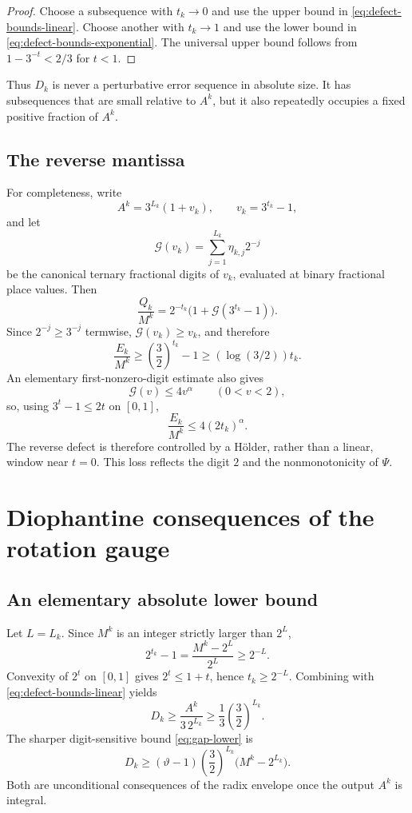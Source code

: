 \documentclass[11pt]{article}
\theoremstyle{definition}
\theoremstyle{remark}
\newcommand{\PsiMap}{\Psi}
\newcommand{\thetaAE}{\vartheta}
\newcommand{\alphaAE}{\alpha}
\begin{document}
\begin{proof}
Choose a subsequence with $t_k\to0$ and use the upper bound in
\eqref{eq:defect-bounds-linear}.  Choose another with $t_k\to1$ and use the
lower bound in \eqref{eq:defect-bounds-exponential}.  The universal upper
bound follows from $1-3^{-t}<2/3$ for $t<1$.
\end{proof}

Thus $D_k$ is never a perturbative error sequence in absolute size.  It has
subsequences that are small relative to $A^k$, but it also repeatedly occupies
a fixed positive fraction of $A^k$.

\subsection{The reverse mantissa}

For completeness, write
\[
 A^k=3^{L_k}(1+v_k),\qquad v_k=3^{t_k}-1,
\]
and let
\[
  \mathcal G(v_k)=\sum_{j=1}^{L_k}\eta_{k,j}2^{-j}
\]
be the canonical ternary fractional digits of $v_k$, evaluated at binary
fractional place values.  Then
\[
  \frac{Q_k}{M^k}
  =2^{-t_k}\bigl(1+\mathcal G(3^{t_k}-1)\bigr).
\]
Since $2^{-j}\ge3^{-j}$ termwise,
$\mathcal G(v_k)\ge v_k$, and therefore
\begin{equation}\label{eq:E-lower}
  \frac{E_k}{M^k}
  \ge\left(\frac32\right)^{t_k}-1
  \ge(\log(3/2))t_k.
\end{equation}
An elementary first-nonzero-digit estimate also gives
\[
  \mathcal G(v)\le4v^{\alphaAE}\qquad(0<v<2),
\]
so, using $3^t-1\le2t$ on $[0,1]$,
\begin{equation}\label{eq:E-upper}
  \frac{E_k}{M^k}
  \le4(2t_k)^{\alphaAE}.
\end{equation}
The reverse defect is therefore controlled by a Hölder, rather than a linear,
window near $t=0$.  This loss reflects the digit $2$ and the nonmonotonicity of
$\PsiMap$.

\section{Diophantine consequences of the rotation gauge}

\subsection{An elementary absolute lower bound}

Let $L=L_k$.  Since $M^k$ is an integer strictly larger than $2^L$,
\[
  2^{t_k}-1=\frac{M^k-2^L}{2^L}\ge2^{-L}.
\]
Convexity of $2^t$ on $[0,1]$ gives $2^t\le1+t$, hence $t_k\ge2^{-L}$.
Combining with \eqref{eq:defect-bounds-linear} yields
\[
  D_k\ge\frac{A^k}{3\,2^{L_k}}
       \ge\frac13\left(\frac32\right)^{L_k}.
\]
The sharper digit-sensitive bound \eqref{eq:gap-lower} is
\[
 D_k\ge(\thetaAE-1)
 \left(\frac32\right)^{L_k}\bigl(M^k-2^{L_k}\bigr).
\]
Both are unconditional consequences of the radix envelope once the output
$A^k$ is integral.
\end{document}
